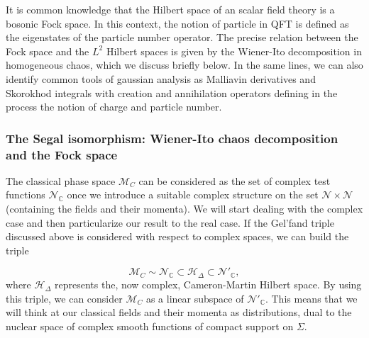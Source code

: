 \documentclass[12pt]{article}%
\begin{document}
It is common knowledge that the Hilbert space of an scalar field theory is a bosonic Fock space. In this context, the notion of particle in QFT is defined as the eigenstates of the  particle number operator.   The precise relation between the Fock space and the $L^2$ Hilbert spaces is given by the Wiener-Ito decomposition in homogeneous chaos, which we discuss briefly below. In the same lines, we can also identify common tools of gaussian analysis as Malliavin derivatives and Skorokhod integrals with creation and annihilation operators defining in the process the notion of charge and particle number. 



\subsubsection{The Segal isomorphism: Wiener-Ito chaos decomposition and the Fock space}
The classical phase space $\mathcal{M}_C$ can be considered as the set of complex test functions $\mathcal{N}_\mathbb{C}$ once we introduce a suitable complex structure on the set $\mathcal{N}\times \mathcal{N}$ (containing the fields and their momenta). We will start dealing with the complex case and then particularize our result to the real case. If the Gel'fand triple discussed above is considered with respect to complex spaces, we can build the triple

\begin{equation}
\label{eq:complexgelfand}
\mathcal{M}_C\sim \mathcal{N}_\mathbb{C}\subset \mathcal{H}_\Delta\subset \mathcal{N}'_\mathbb{C},
\end{equation}
 where $\mathcal{H}_\Delta$ represents the, now complex, Cameron-Martin Hilbert space. By using this triple, we can consider $\mathcal{M}_C$ as a linear subspace of $\mathcal{N}'_\mathbb{C}$. This means that we will think at our classical fields and their momenta as distributions, dual to the nuclear space of complex smooth functions of compact support on $\Sigma$.
\end{document}
